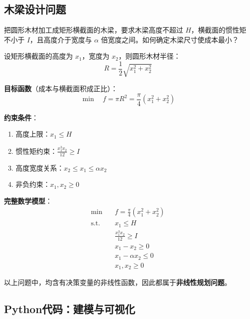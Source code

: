 \subsection{木梁设计问题}

\begin{conceptbox}[问题描述]
把圆形木材加工成矩形横截面的木梁，要求木梁高度不超过 $H$，横截面的惯性矩不小于 $I$，且高度介于宽度与 $\alpha$ 倍宽度之间。如何确定木梁尺寸使成本最小？
\end{conceptbox}

设矩形横截面的高度为 $x_1$，宽度为 $x_2$，则圆形木材半径：
\[
R = \frac{1}{2}\sqrt{x_1^2 + x_2^2}
\]

\textbf{目标函数}（成本与横截面积成正比）：
\[
\min\quad f = \pi R^2 = \frac{\pi}{4}(x_1^2 + x_2^2)
\]

\textbf{约束条件}：
\begin{enumerate}[label=(\arabic*)]
    \item 高度上限：$x_1 \leq H$
    \item 惯性矩约束：$\frac{x_1^3 x_2}{12} \geq I$
    \item 高度宽度关系：$x_2 \leq x_1 \leq \alpha x_2$
    \item 非负约束：$x_1, x_2 \geq 0$
\end{enumerate}

\textbf{完整数学模型}：
\[
\begin{aligned}
\min\quad & f = \frac{\pi}{4}(x_1^2 + x_2^2) \\
\text{s.t.}\quad & x_1 \leq H \\
& \frac{x_1^3 x_2}{12} \geq I \\
& x_1 - x_2 \geq 0 \\
& x_1 - \alpha x_2 \leq 0 \\
& x_1, x_2 \geq 0
\end{aligned}
\]

\begin{notebox}[关键观察]
以上问题中，均含有决策变量的非线性函数，因此都属于\textbf{非线性规划问题}。
\end{notebox}

\subsection{Python代码：建模与可视化}

